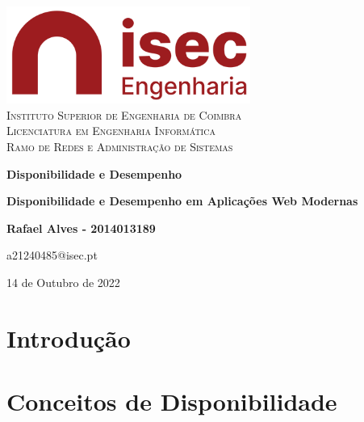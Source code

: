\documentclass[a4paper,12pt]{report}
\def\data{14 de Outubro de 2022}
\begin{document}
\nocite{*}
    \begin{titlepage}
    	\begin{center}
    		\includegraphics[width=0.6\textwidth]{logo_isec.png}
    		\large\textsc{
				   \\Instituto Superior de Engenharia de Coimbra\\
				   Licenciatura em Engenharia Informática\\
				   Ramo de Redes e Administração de Sistemas
	            }
    		
    		\vspace{3cm}
    		\huge
    		\textbf{Disponibilidade e Desempenho}
    		\vspace{1.5cm}
    		
    		\huge
    		\textbf{Disponibilidade e Desempenho em Aplicações Web Modernas}
    		
    		\vspace{2cm}
    		\textbf{Rafael Alves - 2014013189}
    		
    		\vfill
    		a21240485@isec.pt
    		
    		\vspace*{\fill}
    		\normalsize
            \data
    	\end{center}
    \end{titlepage}


\tableofcontents
\listoftables
\listoffigures

%



\clearpage
{}

\chapter{Introdução}


\chapter{Conceitos de Disponibilidade}

\end{document}
